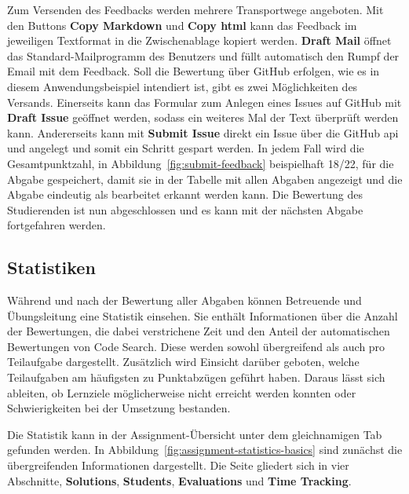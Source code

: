 Zum Versenden des Feedbacks werden mehrere Transportwege angeboten.
Mit den Buttons \textbf{Copy Markdown} und \textbf{Copy \acs{html}} kann das Feedback im jeweiligen Textformat in die Zwischenablage kopiert werden.
\textbf{Draft Mail} öffnet das Standard-Mailprogramm des Benutzers und füllt automatisch den Rumpf der Email mit dem Feedback.
Soll die Bewertung über GitHub erfolgen, wie es in diesem Anwendungsbeispiel intendiert ist, gibt es zwei Möglichkeiten des Versands.
Einerseits kann das Formular zum Anlegen eines Issues auf GitHub mit \textbf{Draft Issue} geöffnet werden, sodass ein weiteres Mal der Text überprüft werden kann.
Andererseits kann mit \textbf{Submit Issue} direkt ein Issue über die GitHub \ac{api} und angelegt und somit ein Schritt gespart werden.
In jedem Fall wird die Gesamtpunktzahl, in Abbildung~\ref{fig:submit-feedback} beispielhaft 18/22, für die Abgabe gespeichert, damit sie in der Tabelle mit allen Abgaben angezeigt und die Abgabe eindeutig als bearbeitet erkannt werden kann.
Die Bewertung des Studierenden ist nun abgeschlossen und es kann mit der nächsten Abgabe fortgefahren werden.

\subsection{Statistiken}\label{subsec:statistics}

Während und nach der Bewertung aller Abgaben können Betreuende und Übungsleitung eine Statistik einsehen.
Sie enthält Informationen über die Anzahl der Bewertungen, die dabei verstrichene Zeit und den Anteil der automatischen Bewertungen von Code Search.
Diese werden sowohl übergreifend als auch pro Teilaufgabe dargestellt.
Zusätzlich wird Einsicht darüber geboten, welche Teilaufgaben am häufigsten zu Punktabzügen geführt haben.
Daraus lässt sich ableiten, ob Lernziele möglicherweise nicht erreicht werden konnten oder Schwierigkeiten bei der Umsetzung bestanden.

Die Statistik kann in der Assignment-Übersicht unter dem gleichnamigen Tab gefunden werden.
In Abbildung~\ref{fig:assignment-statistics-basics} sind zunächst die übergreifenden Informationen dargestellt.
Die Seite gliedert sich in vier Abschnitte, \textbf{Solutions}, \textbf{Students}, \textbf{Evaluations} und \textbf{Time Tracking}.

